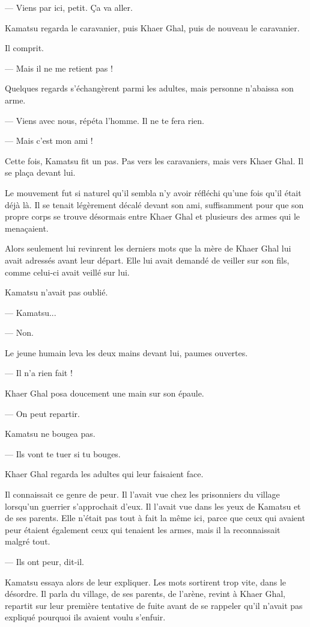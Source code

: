 — Viens par ici, petit. Ça va aller.

Kamatsu regarda le caravanier, puis Khaer Ghal, puis de nouveau le caravanier.

Il comprit.

— Mais il ne me retient pas !

Quelques regards s'échangèrent parmi les adultes, mais personne n'abaissa son
arme.

— Viens avec nous, répéta l'homme. Il ne te fera rien.

— Mais c'est mon ami !

Cette fois, Kamatsu fit un pas. Pas vers les caravaniers, mais vers Khaer Ghal.
Il se plaça devant lui.

Le mouvement fut si naturel qu'il sembla n'y avoir réfléchi qu'une fois qu'il
était déjà là. Il se tenait légèrement décalé devant son ami, suffisamment pour
que son propre corps se trouve désormais entre Khaer Ghal et plusieurs des
armes qui le menaçaient.

Alors seulement lui revinrent les derniers mots que la mère de Khaer Ghal lui
avait adressés avant leur départ. Elle lui avait demandé de veiller sur son
fils, comme celui-ci avait veillé sur lui.

Kamatsu n'avait pas oublié.

— Kamatsu...

— Non.

Le jeune humain leva les deux mains devant lui, paumes ouvertes.

— Il n'a rien fait !

Khaer Ghal posa doucement une main sur son épaule.

— On peut repartir.

Kamatsu ne bougea pas.

— Ils vont te tuer si tu bouges.

\scenebreak

Khaer Ghal regarda les adultes qui leur faisaient face.

Il connaissait ce genre de peur. Il l'avait vue chez les prisonniers du
village lorsqu'un guerrier s'approchait d'eux. Il l'avait vue dans les yeux de
Kamatsu et de ses parents. Elle n'était pas tout à fait la même ici, parce que
ceux qui avaient peur étaient également ceux qui tenaient les armes, mais il
la reconnaissait malgré tout.

— Ils ont peur, dit-il.

Kamatsu essaya alors de leur expliquer. Les mots sortirent trop vite, dans le
désordre. Il parla du village, de ses parents, de l'arène, revint à Khaer Ghal,
repartit sur leur première tentative de fuite avant de se rappeler qu'il
n'avait pas expliqué pourquoi ils avaient voulu s'enfuir.

